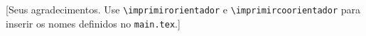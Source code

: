 %

\begin{agradecimentos}

[Seus agradecimentos. Use \texttt{\textbackslash imprimirorientador} e
\texttt{\textbackslash imprimircoorientador} para inserir os nomes
definidos no \texttt{main.tex}.]

\end{agradecimentos}

